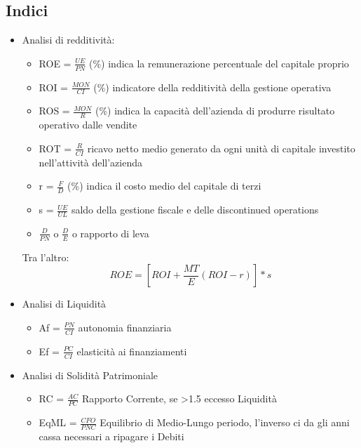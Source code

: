 \documentclass[a4paper]{report}
\begin{document}
\subsection*{Indici}
\begin{itemize}
    \item Analisi di redditività: \begin{itemize}
        \item ROE = $\frac{UE}{PN}$ (\%)
        indica la remunerazione percentuale del capitale proprio
        \item ROI = $\frac{MON}{CI}$ (\%)
        indicatore della redditività della gestione operativa
        \item ROS = $\frac{MON}{R}$ (\%)
        indica la capacità dell’azienda di produrre risultato operativo dalle
        vendite
        \item ROT = $\frac{R}{CI}$
        ricavo netto medio generato da ogni unità di capitale
        investito nell'attività dell'azienda
        \item r = $\frac{F}{D}$ (\%)
        indica il costo medio del
        capitale di terzi
        \item s = $\frac{UE}{UL}$ saldo della gestione fiscale e delle discontinued operations
        \item $\frac{D}{PN}$ o $\frac{D}{E}$ o rapporto di leva
    \end{itemize}
    Tra l'altro:
    \[
    ROE=[ROI+\frac{MT}{E}(ROI-r)]*s     
    \]
    \item Analisi di Liquidità  \begin{itemize}
        \item Af = $\frac{PN}{CI}$ autonomia finanziaria
        \item Ef = $\frac{PC}{CI}$  elasticità ai finanziamenti
    \end{itemize}
    \item Analisi di Solidità Patrimoniale \begin{itemize}
        \item RC = $\frac{AC}{PC}$ Rapporto Corrente, se >1.5 eccesso Liquidità
        \item EqML = $\frac{CFO}{PNC}$  Equilibrio di Medio-Lungo periodo, l'inverso ci da gli anni cassa necessari a ripagare i Debiti
    \end{itemize}
\end{itemize}
\end{document}
